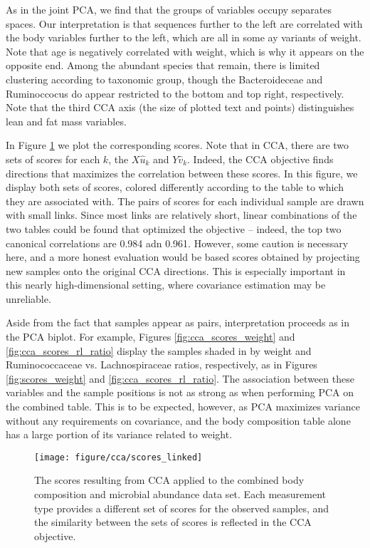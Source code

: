 \documentclass{article}
\begin{document}
As in the joint PCA, we find that the groups of variables occupy separates
spaces. Our interpretation is that sequences further to the left are correlated
with the body variables further to the left, which are all in some ay variants
of weight. Note that age is negatively correlated with weight, which is why it
appears on the opposite end. Among the abundant species that remain, there is
limited clustering according to taxonomic group, though the Bacteroideceae and
Ruminoccocus do appear restricted to the bottom and top right, respectively.
Note that the third CCA axis (the size of plotted text and points) distinguishes
lean and fat mass variables.

In Figure \ref{fig:cca_scores_linked} we plot the corresponding scores. Note
that in CCA, there are two sets of scores for each $k$, the $X\hat{u}_{k}$ and
$Y\hat{v}_{k}$. Indeed, the CCA objective finds directions that maximizes the
correlation between these scores. In this figure, we display both sets of
scores, colored differently according to the table to which they are associated
with. The pairs of scores for each individual sample are drawn with small links.
Since most links are relatively short, linear combinations of the two tables
could be found that optimized the objective -- indeed, the top two canonical
correlations are 0.984 adn 0.961. However, some caution is necessary here, and a
more honest evaluation would be based scores obtained by projecting new samples
onto the original CCA directions. This is especially important in this nearly
high-dimensional setting, where covariance estimation may be unreliable.

Aside from the fact that samples appear as pairs, interpretation proceeds as in
the PCA biplot. For example, Figures \ref{fig:cca_scores_weight} and
\ref{fig:cca_scores_rl_ratio} display the samples shaded in by weight and
Ruminococcaceae vs. Lachnospiraceae ratios, respectively, as in Figures
\ref{fig:scores_weight} and \ref{fig:cca_scores_rl_ratio}. The association
between these variables and the sample positions is not as strong as when
performing PCA on the combined table. This is to be expected, however, as PCA
maximizes variance without any requirements on covariance, and the body
composition table alone has a large portion of its variance related to weight.

\begin{figure}[ht]
  \centering
  \texttt{[image: figure/cca/scores\_linked]}
  \caption{The scores resulting from CCA applied to the combined body
    composition and microbial abundance data set. Each measurement type provides
    a different set of scores for the observed samples, and the similarity
    between the sets of scores is reflected in the CCA
    objective.\label{fig:cca_scores_linked}}
\end{figure}
\end{document}
